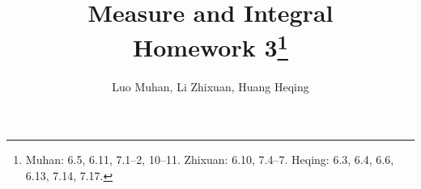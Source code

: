 \documentclass[11pt]{article}
\theoremstyle{definition}
\begin{document}
  \title{\textbf{Measure and Integral}\\ Homework 3\footnote{
    Muhan: 6.5, 6.11, 7.1--2, 10--11.
    Zhixuan: 6.10, 7.4--7.
    Heqing: 6.3, 6.4, 6.6, 6.13, 7.14, 7.17.}}
  \author{Luo Muhan, Li Zhixuan, Huang Heqing}
  \maketitle

%
%  
%
%  

%  
  \setcounter{section}{5}
%  
%  
   
   
\end{document}
